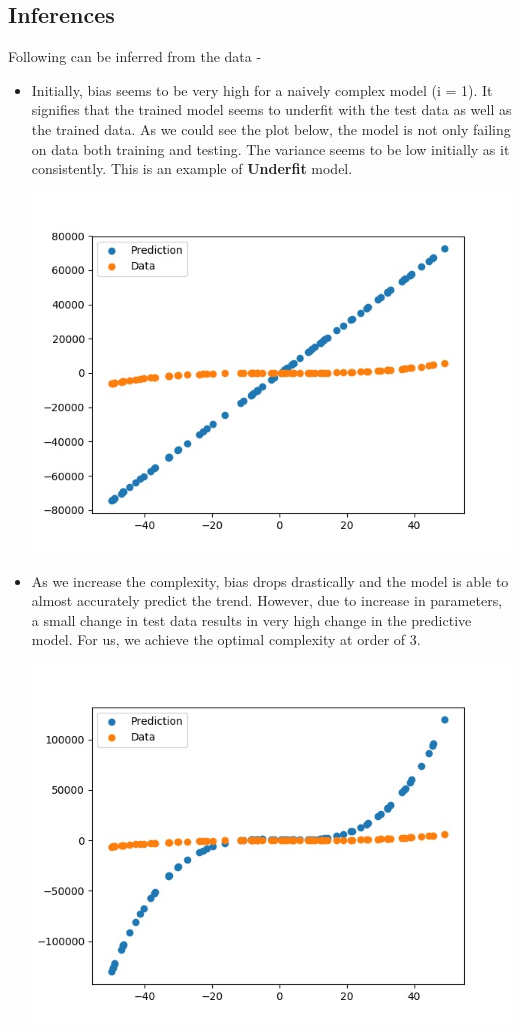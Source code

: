 \documentclass[11pt]{article}
\begin{document}
	\subsection{Inferences}
	Following can be inferred from the data - 
	\begin{itemize}
		\item Initially, bias seems to be very high for a naively complex model (i = 1). It signifies that the trained model seems to underfit with the test data as well as the trained data. As we could see the plot below, the model is not only failing on data both training and testing. The variance seems to be low initially as it consistently. This is an example of \textbf{Underfit} model.
		\begin{center}
		\hspace{-1.5cm}\includegraphics[scale=0.8]{../q2fig1.jpg}
		\end{center}
		\item As we increase the complexity, bias drops drastically and the model is able to almost accurately predict the trend. However, due to increase in parameters, a small change in test data results in very high change in the predictive model. For us, we achieve the optimal complexity at order of 3.
		\begin{center}
	\hspace{-1.5cm}\includegraphics[scale=0.8]{../q2fig3.jpg}

\end{center}
\end{itemize}
\end{document}
